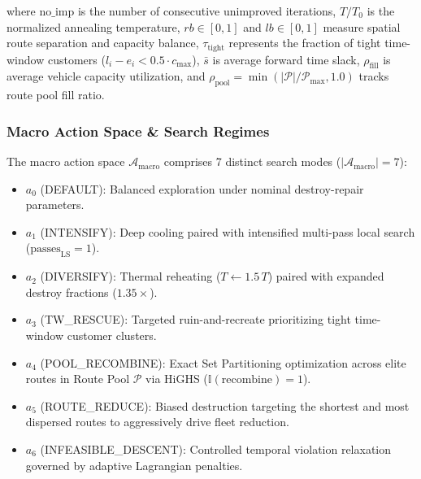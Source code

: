 where $\text{no\_imp}$ is the number of consecutive unimproved iterations, $T/T_0$ is the normalized annealing temperature, $rb \in [0, 1]$ and $lb \in [0, 1]$ measure spatial route separation and capacity balance, $\tau_{\text{tight}}$ represents the fraction of tight time-window customers ($l_i - e_i < 0.5 \cdot c_{\max}$), $\bar{s}$ is average forward time slack, $\rho_{\text{fill}}$ is average vehicle capacity utilization, and $\rho_{\text{pool}} = \min(|\mathcal{P}|/\mathcal{P}_{\max}, 1.0)$ tracks route pool fill ratio.

\subsubsection{Macro Action Space \& Search Regimes}
The macro action space $\mathcal{A}_{\text{macro}}$ comprises 7 distinct search modes ($|\mathcal{A}_{\text{macro}}| = 7$):
\begin{itemize}
    \item $a_0$ (\textsf{\small DEFAULT}): Balanced exploration under nominal destroy-repair parameters.
    \item $a_1$ (\textsf{\small INTENSIFY}): Deep cooling paired with intensified multi-pass local search ($\text{passes}_{\text{LS}} = 1$).
    \item $a_2$ (\textsf{\small DIVERSIFY}): Thermal reheating ($T \leftarrow 1.5\,T$) paired with expanded destroy fractions ($1.35\times$).
    \item $a_3$ (\textsf{\small TW\_RESCUE}): Targeted ruin-and-recreate prioritizing tight time-window customer clusters.
    \item $a_4$ (\textsf{\small POOL\_RECOMBINE}): Exact Set Partitioning optimization across elite routes in Route Pool $\mathcal{P}$ via HiGHS ($\mathbb{I}(\text{recombine}) = 1$).
    \item $a_5$ (\textsf{\small ROUTE\_REDUCE}): Biased destruction targeting the shortest and most dispersed routes to aggressively drive fleet reduction.
    \item $a_6$ (\textsf{\small INFEASIBLE\_DESCENT}): Controlled temporal violation relaxation governed by adaptive Lagrangian penalties.
\end{itemize}

